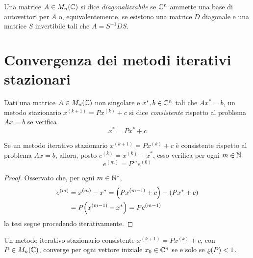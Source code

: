 	\begin{definizione}
		Una matrice \(A \in M_n (\mathbb{C})\) si dice \emph{diagonalizzabile} se \(\mathbb{C}^n\) ammette una base di autovettori per \(A\) o, equivalentemente, se esistono una matrice \(D\) diagonale e una matrice \(S\) invertibile tali che \(A = S^{-1} D S\).
	\end{definizione}

\section{Convergenza dei metodi iterativi stazionari}
	
	\begin{definizione}\label{def:metodo-consistente}
		Dati una matrice \(A \in M_n (\mathbb{C})\) non singolare e \(x^*, b \in \mathbb{C}^n\) tali che \(A x^* = b\), un metodo stazionario \(x^{(k + 1)} = P x^{(k)} + c\) si dice \emph{consistente} rispetto al problema \(A x = b\) se verifica
		\begin{equation}
			x^* = P x^* + c
		\end{equation}
	\end{definizione}

	\begin{lemma}\label{lem:errore-metodo-iter-staz}
		Se un metodo iterativo stazionario \(x^{(k + 1)} = P x^{(k)} + c\) è consistente rispetto al problema \(A x = b\), allora, posto \(e^{(k)} = x^{(k)} - x^*\), esso verifica per ogni \(m \in \mathbb{N}\)
		\begin{equation}\label{eq:errore-metodo-iter-staz}
			e^{(m)} = P^m e^{(0)}
		\end{equation}
	\end{lemma}

	\begin{proof}
		Osservato che, per ogni \(m \in \mathbb{N}^*\),
		\begin{equation*}
			\begin{split}
				e^{(m)} &= x^{(m)} - x^* = \qty(P x^{(m - 1)} + c) - \qty(P x^* + c) \\
				&= P \qty(x^{(m - 1)} - x^*) = P e^{(m - 1)}
			\end{split}
		\end{equation*}
		la tesi segue procedendo iterativamente.
	\end{proof}

	\begin{teorema}\label{th:conv-raggio-spettr}
		Un metodo iterativo stazionario consistente \(x^{(k + 1)} = P x^{(k)} + c\), con \(P \in M_n (\mathbb{C})\), converge per ogni vettore iniziale \(x_0 \in \mathbb{C}^n\) se e solo se \(\operatorname{\varrho} (P) < 1\).
	\end{teorema}

